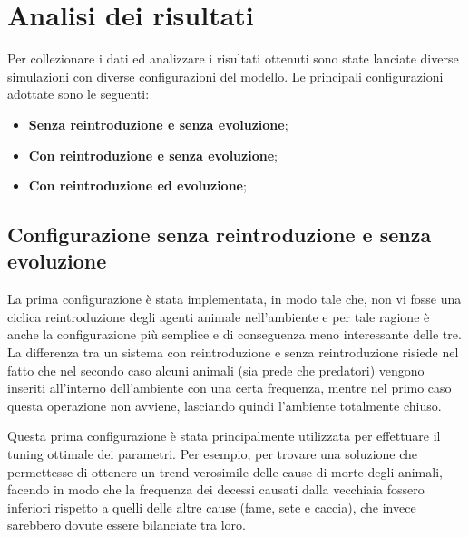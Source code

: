 \documentclass[11pt]{article}
\begin{document}

\section{Analisi dei risultati}
Per collezionare i dati ed analizzare i risultati ottenuti sono state lanciate diverse simulazioni con diverse configurazioni del modello. Le principali configurazioni adottate sono le seguenti: 
\begin{itemize}
    \item \textbf{Senza reintroduzione e senza evoluzione};
    \item \textbf{Con reintroduzione e senza evoluzione};
    \item \textbf{Con reintroduzione ed evoluzione};
\end{itemize}
\subsection{Configurazione senza reintroduzione e senza evoluzione}
La prima configurazione è stata implementata, in modo tale che, non vi fosse una ciclica reintroduzione degli agenti animale nell'ambiente e per tale ragione è anche la configurazione più semplice e di conseguenza meno interessante delle tre. 
La differenza tra un sistema con reintroduzione e senza reintroduzione risiede nel fatto che nel secondo caso alcuni animali (sia prede che predatori) vengono inseriti all'interno dell'ambiente con una certa frequenza, mentre nel primo caso questa operazione non avviene, lasciando quindi l'ambiente totalmente chiuso.

Questa prima configurazione è stata principalmente utilizzata per effettuare il tuning ottimale dei parametri. Per esempio, per trovare una soluzione che permettesse di ottenere un trend verosimile delle cause di morte degli animali, facendo in modo che la frequenza dei decessi causati dalla vecchiaia fossero inferiori rispetto a quelli delle altre cause (fame, sete e caccia), che invece sarebbero dovute essere bilanciate tra loro.   
\end{document}
